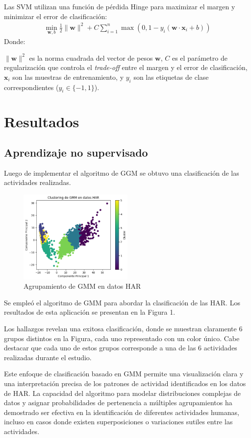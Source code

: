 \documentclass{esannV2}
\begin{document}
Las SVM utilizan una función de pérdida Hinge para maximizar el margen y minimizar el error de clasificación:
\begin{eqnarray}
\min_{\mathbf{w}, b} \frac{1}{2} \| \mathbf{w} \|^2 + C \sum_{i=1}^n \max(0, 1 - y_i (\mathbf{w} \cdot \mathbf{x}_i + b))
\end{eqnarray}
Donde:

 \( \| \mathbf{w} \|^2 \) es la norma cuadrada del vector de pesos \( \mathbf{w} \), \( C \) es el parámetro de regularización que controla el \textit{trade-off} entre el margen y el error de clasificación, \( \mathbf{x}_i \) son las muestras de entrenamiento, y \( y_i \) son las etiquetas de clase correspondientes (\( y_i \in \{-1, 1\} \)).


\section{Resultados}
\subsection{Aprendizaje no supervisado}
Luego de implementar el algoritmo de GGM se obtuvo una clasificación de las actividades realizadas.
\begin{figure}[ht!]
\centering
\includegraphics[width=0.5\textwidth]{figs/Resultados.png}
\caption{Agrupamiento de GMM en datos HAR}\label{Fig:resultados}
\end{figure}
Se empleó el algoritmo de GMM para abordar la clasificación de las HAR. Los resultados de esta aplicación se presentan en la Figura 1.

Los hallazgos revelan una exitosa clasificación, donde se muestran claramente 6 grupos distintos en la Figura, cada uno representado con un color único. Cabe destacar que cada uno de estos grupos corresponde a una de las 6 actividades realizadas durante el estudio.

Este enfoque de clasificación basado en GMM permite una visualización clara y una interpretación precisa de los patrones de actividad identificados en los datos de HAR. La capacidad del algoritmo para modelar distribuciones complejas de datos y asignar probabilidades de pertenencia a múltiples agrupamientos ha demostrado ser efectiva en la identificación de diferentes actividades humanas, incluso en casos donde existen superposiciones o variaciones sutiles entre las actividades.
\end{document}
